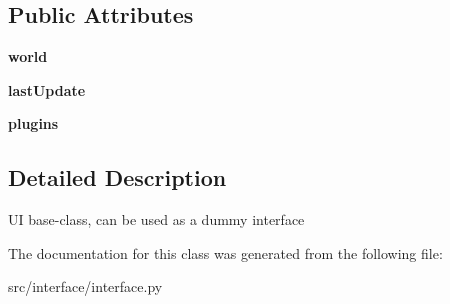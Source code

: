\subsection*{\-Public \-Attributes}
\begin{DoxyCompactItemize}
\item 
\hypertarget{classinterface_1_1interface_1_1_interface_aa48bb41df8a8ef635c6d5fd9a3f1b502}{{\bfseries world}}\label{classinterface_1_1interface_1_1_interface_aa48bb41df8a8ef635c6d5fd9a3f1b502}

\item 
\hypertarget{classinterface_1_1interface_1_1_interface_ae09dfa2d4e610bbcf7315357f4b6ff7c}{{\bfseries last\-Update}}\label{classinterface_1_1interface_1_1_interface_ae09dfa2d4e610bbcf7315357f4b6ff7c}

\item 
\hypertarget{classinterface_1_1interface_1_1_interface_ad64363a847c04ef733dcf432f7900b80}{{\bfseries plugins}}\label{classinterface_1_1interface_1_1_interface_ad64363a847c04ef733dcf432f7900b80}

\end{DoxyCompactItemize}


\subsection{\-Detailed \-Description}
\begin{DoxyVerb}UI base-class, can be used as a dummy interface \end{DoxyVerb}
 

\-The documentation for this class was generated from the following file\-:\begin{DoxyCompactItemize}
\item 
src/interface/interface.\-py\end{DoxyCompactItemize}
